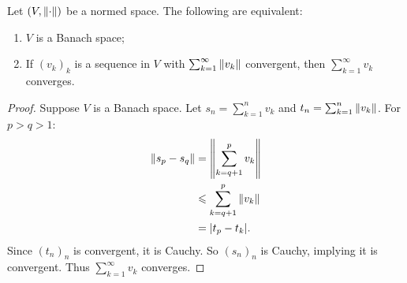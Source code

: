     \begin{proposition}
        Let $(V,\left\lVert \cdot \right\rVert)$ be a normed space. The following are equivalent:
            \begin{enumerate}[label = (\arabic*),itemsep=1pt,topsep=3pt]
                \item $V$ is a Banach space;
                \item If $(v_k)_k$ is a sequence in $V$ with $\sum_{k = 1}^\infty \left\lVert v_k \right\rVert$ convergent, then $\sum_{ k =1}^\infty v_k$ converges.
            \end{enumerate}
    \end{proposition}
        \begin{proof}
            Suppose $V$ is a Banach space. Let $s_n = \sum_{k = 1}^n v_k$ and $t_n = \sum_{k = 1}^n \left\lVert v_k \right\rVert$. For $p > q > 1$:
                \begin{equation*}
                \begin{split}
                    \left\lVert s_p - s_q \right\rVert
                    & = \left\lVert \sum_{k = q +1}^p v_k \right\rVert \\
                    & \leqslant \sum_{k = q + 1}^p \left\lVert v_k \right\rVert \\
                    & = |t_p - t_k|.
                \end{split}
                \end{equation*}
            Since $(t_n)_n$ is convergent, it is Cauchy. So $(s_n)_n$ is Cauchy, implying it is convergent. Thus $\sum_{k = 1}^\infty v_k$ converges.


\end{proof}
